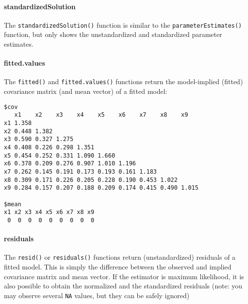 \paragraph{standardizedSolution}

The \texttt{standardizedSolution()} function is similar to the
\texttt{parameterEstimates()} function, but only shows the
unstandardized and standardized parameter estimates.

\paragraph{fitted.values}

The \texttt{fitted()} and \texttt{fitted.values()} functions return the
model-implied (fitted) covariance matrix (and mean vector) of a fitted
model:

\begin{Shaded}
\begin{Highlighting}[]
\StringTok{ } 
\end{Highlighting}
\end{Shaded}

\begin{verbatim}
$cov
   x1    x2    x3    x4    x5    x6    x7    x8    x9   
x1 1.358                                                
x2 0.448 1.382                                          
x3 0.590 0.327 1.275                                    
x4 0.408 0.226 0.298 1.351                              
x5 0.454 0.252 0.331 1.090 1.660                        
x6 0.378 0.209 0.276 0.907 1.010 1.196                  
x7 0.262 0.145 0.191 0.173 0.193 0.161 1.183            
x8 0.309 0.171 0.226 0.205 0.228 0.190 0.453 1.022      
x9 0.284 0.157 0.207 0.188 0.209 0.174 0.415 0.490 1.015

$mean
x1 x2 x3 x4 x5 x6 x7 x8 x9 
 0  0  0  0  0  0  0  0  0 
\end{verbatim}

\paragraph{residuals}

The \texttt{resid()} or \texttt{residuals()} functions return
(unstandardized) residuals of a fitted model. This is simply the
difference between the observed and implied covariance matrix and mean
vector. If the estimator is maximum likelihood, it is also possible to
obtain the normalized and the standardized residuals (note: you may
observe several \texttt{NA} values, but they can be safely ignored)


